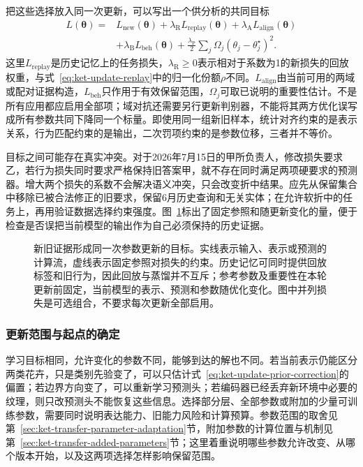 把这些选择放入同一次更新，可以写出一个供分析的共同目标
\begin{equation}
\begin{split}
L(\bm\theta)={}&L_{\mathrm{new}}(\bm\theta)
+\lambda_{\mathrm R}L_{\mathrm{replay}}(\bm\theta)
+\lambda_{\mathrm A}L_{\mathrm{align}}(\bm\theta)\\
&+\lambda_{\mathrm B}L_{\mathrm{beh}}(\bm\theta)
+\frac{\lambda_{\mathrm P}}2
\sum_j\Omega_j(\theta_j-\theta_j^\star)^2.
\end{split}
\label{eq:ket-update-joint-objective}
\end{equation}
这里$L_{\mathrm{replay}}$是历史记忆上的任务损失，$\lambda_{\mathrm R}\geq0$表示相对于系数为1的新损失的回放权重，与式~\eqref{eq:ket-update-replay}中的归一化份额$\rho$不同。$L_{\mathrm{align}}$由当前可用的两域或配对证据构造，$L_{\mathrm{beh}}$只作用于有效保留范围，$\Omega_j$可取已说明的重要性估计。不是所有应用都应启用全部项；域对抗还需要另行更新判别器，不能将其两方优化误写成所有参数共同下降同一个标量。即使用同一组新旧样本，统计对齐约束的是表示关系，行为匹配约束的是输出，二次罚项约束的是参数位移，三者并不等价。

目标之间可能存在真实冲突。对于2026年7月15日的甲所负责人，修改损失要求乙，若行为损失同时要求严格保持旧答案甲，就不存在同时满足两项硬要求的预测器。增大两个损失的系数不会解决语义冲突，只会改变折中结果。应先从保留集合中移除已被合法修正的旧要求，保留6月历史查询和无关实体；在允许软折中的任务上，再用验证数据选择约束强度。图~\ref{fig:ket-update-objective}标出了固定参照和随更新变化的量，便于检查是否误把当前模型的输出作为自己必须保持的历史证据。

\begin{figure}[htbp]
\centering

\caption{新旧证据形成同一次参数更新的目标。实线表示输入、表示或预测的计算流，虚线表示固定参照对损失的约束。历史记忆可同时提供回放标签和旧行为，因此回放与蒸馏并不互斥；参考参数及重要性在本轮更新前固定，当前模型的表示、预测和参数随优化变化。图中并列损失是可选组合，不要求每次更新全部启用。}
\label{fig:ket-update-objective}
\end{figure}

\FloatBarrier
\subsubsection{更新范围与起点的确定}
\label{sec:ket-update-range}

学习目标相同，允许变化的参数不同，能够到达的解也不同。若当前表示仍能区分两类花卉，只是类别先验变了，可以只估计式~\eqref{eq:ket-update-prior-correction}的偏置；若边界方向变了，可以重新学习预测头；若编码器已经丢弃新环境中必要的纹理，则只改预测头不能恢复这些信息。选择部分层、全部参数或附加的少量可训练参数，需要同时说明表达能力、旧能力风险和计算预算。参数范围的取舍见第~\ref{sec:ket-transfer-parameter-adaptation}节，附加参数的计算位置与机制见第~\ref{sec:ket-transfer-added-parameters}节；这里着重说明哪些参数允许改变、从哪个版本开始，以及这两项选择怎样影响保留范围。

